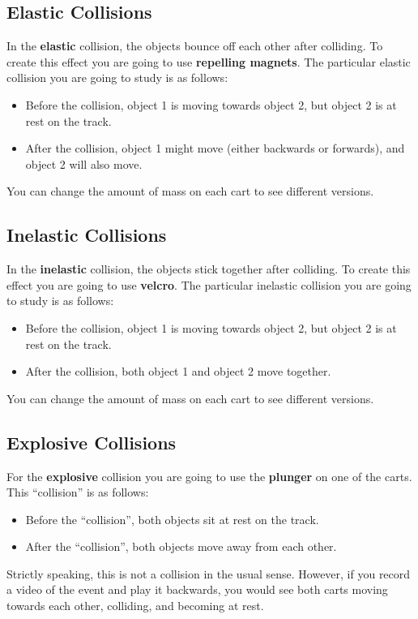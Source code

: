 \subsection{Elastic Collisions}
%
In the \textbf{elastic} collision, the objects bounce off each other after colliding. To create this effect you are going to use \textbf{repelling magnets}. The particular elastic collision you are going to study is as follows:
\begin{itemize}
    \item Before the collision, object 1 is moving towards object 2, but object 2 is at rest on the track.
    \item After the collision, object 1 might move (either backwards or forwards), and object 2 will also move.
\end{itemize}
You can change the amount of mass on each cart to see different versions.
%
\subsection{Inelastic Collisions}
%
In the \textbf{inelastic} collision, the objects stick together after colliding. To create this effect you are going to use \textbf{velcro}. The particular inelastic collision you are going to study is as follows:
\begin{itemize}
    \item Before the collision, object 1 is moving towards object 2, but object 2 is at rest on the track.
    \item After the collision, both object 1 and object 2 move together.
\end{itemize}
You can change the amount of mass on each cart to see different versions.
%
\subsection{Explosive Collisions}
%
For the \textbf{explosive} collision you are going to use the \textbf{plunger} on one of the carts. This ``collision'' is as follows:
\begin{itemize}
    \item Before the ``collision'', both objects sit at rest on the track.
    \item After the ``collision'', both objects move away from each other.
\end{itemize}
Strictly speaking, this is not a collision in the usual sense. However, if you record a video of the event and play it backwards, you would see both carts moving towards each other, colliding, and becoming at rest.

